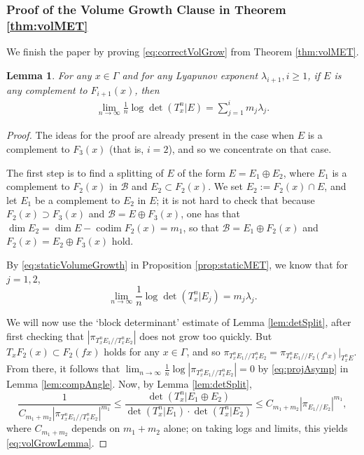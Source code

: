 \documentclass[11pt]{amsart}
\theoremstyle{theorem}
\newtheorem{lem}[thm]{Lemma}
\theoremstyle{definition}
\numberwithin{equation}{section}
\renewcommand{\l}{\lambda}
\newcommand{\Bc}{\mathcal{B}}
\newcommand{\ds}{/ \! /}
\newcommand{\codim}{\operatorname{codim}}
\begin{document}
\subsubsection{Proof of the Volume Growth Clause in Theorem \ref{thm:volMET}}

We finish the paper by proving \eqref{eq:correctVolGrow} from Theorem \ref{thm:volMET}.

\begin{lem}\label{lem:rightVolGrow}
For any $x \in \Gamma$ and for any Lyapunov exponent $\l_{i + 1}, i \geq 1$, if $E$ is any complement to $F_{i + 1}(x)$, then
\begin{align}\label{eq:volGrowLemma}
\lim_{n \to \infty} \frac{1}{n} \log \det(T^n_x | E) = \sum_{j = 1}^i m_j \l_j.
\end{align}
\end{lem}
\begin{proof}
The ideas for the proof are already present in the case when $E$ is a complement to $F_3(x)$ (that is, $i = 2$), and so we concentrate on that case.

The first step is to find a splitting of $E$ of the form $E = E_1 \oplus E_2$, where $E_1$ is a complement to $F_2(x)$ in $\Bc$ and $E_2 \subset F_2(x)$. We set $E_2 := F_2(x) \cap E$, and let $E_1$ be a complement to $E_2$ in $E$; it is not hard to check that because $F_2(x) \supset F_3(x)$ and $\Bc = E \oplus F_3(x)$, one has that $\dim E_2 = \dim E - \codim F_2(x) = m_1$, so that $\Bc = E_1 \oplus F_2(x)$ and $F_2(x) = E_2 \oplus F_3(x)$ hold. 

By \eqref{eq:staticVolumeGrowth} in Proposition \ref{prop:staticMET}, we know that for $j = 1,2$,
\[
\lim_{n \to \infty} \frac{1}{n} \log \det(T^n_x | E_j) = m_j \l_j.
\]

We will now use the `block determinant' estimate of Lemma \ref{lem:detSplit}, after first checking that $|\pi_{T^n_x E_1 \ds T^n_x E_2}|$ does not grow too quickly. But $T_x F_2(x) \subset F_2(f x)$ holds for any $x \in \Gamma$, and so $\pi_{T^n_x E_1 \ds T^n_x E_2} = \pi_{T^n_x E_1 \ds F_2(f^n x)}|_{T^n_x E}$. From there, it follows that $\lim_{n \to \infty} \frac{1}{n} \log |\pi_{T^n_x E_1 \ds T^n_x E_2}| = 0$
 by \eqref{eq:projAsymp} in Lemma \ref{lem:compAngle}. Now, by Lemma \ref{lem:detSplit},
\[
\frac{1}{C_{m_1 + m_2} |\pi_{T^n_x E_1 \ds T^n_x E_2}|^{m_1} } \leq \frac{\det(T^n_x | E_1 \oplus E_2)}{\det(T^n_x | E_1) \cdot \det(T^n_x | E_2)} \leq C_{m_1 + m_2} |\pi_{E_1 \ds E_2}|^{m_1} ,
\]
where $C_{m_1 + m_2}$ depends on $m_1 + m_2$ alone; on taking logs and limits, this yields \eqref{eq:volGrowLemma}.
\end{proof}
\end{document}
